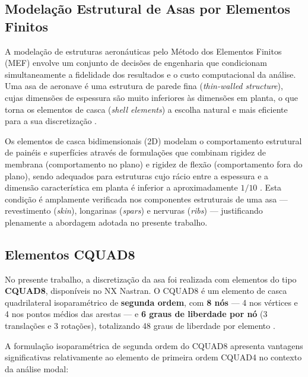 \documentclass[11pt,twoside,a4paper]{report}
\begin{document}
\subsection{Modelação Estrutural de Asas por Elementos Finitos}

A modelação de estruturas aeronáuticas pelo Método dos Elementos Finitos (MEF) envolve um conjunto de decisões de engenharia que condicionam simultaneamente a fidelidade dos resultados e o custo computacional da análise. Uma asa de aeronave é uma estrutura de parede fina (\textit{thin-walled structure}), cujas dimensões de espessura são muito inferiores às dimensões em planta, o que torna os elementos de casca (\textit{shell elements}) a escolha natural e mais eficiente para a sua discretização \cite{Bathe2014, Cook2001}.

Os elementos de casca bidimensionais (2D) modelam o comportamento estrutural de painéis e superfícies através de formulações que combinam rigidez de membrana (comportamento no plano) e rigidez de flexão (comportamento fora do plano), sendo adequados para estruturas cujo rácio entre a espessura e a dimensão característica em planta é inferior a aproximadamente $1/10$ \cite{Zienkiewicz2005}. Esta condição é amplamente verificada nos componentes estruturais de uma asa --- revestimento (\textit{skin}), longarinas (\textit{spars}) e nervuras (\textit{ribs}) --- justificando plenamente a abordagem adotada no presente trabalho.

\subsection{Elementos CQUAD8}

No presente trabalho, a discretização da asa foi realizada com elementos do tipo \textbf{CQUAD8}, disponíveis no NX Nastran. O CQUAD8 é um elemento de casca quadrilateral isoparamétrico de \textbf{segunda ordem}, com \textbf{8 nós} --- 4 nos vértices e 4 nos pontos médios das arestas --- e \textbf{6 graus de liberdade por nó} (3 translações e 3 rotações), totalizando 48 graus de liberdade por elemento \cite{Nastran2014, Cook2001}.

A formulação isoparamétrica de segunda ordem do CQUAD8 apresenta vantagens significativas relativamente ao elemento de primeira ordem CQUAD4 no contexto da análise modal:
\end{document}
